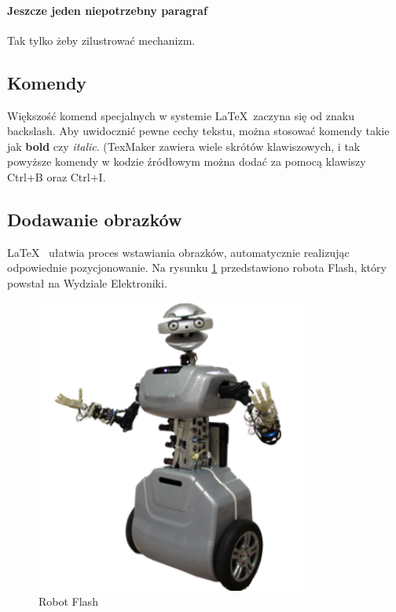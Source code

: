 \documentclass[12pt,a4paper]{article}
\begin{document}
\paragraph{Jeszcze jeden niepotrzebny paragraf} Tak tylko żeby zilustrować mechanizm.

\subsection{Komendy}
Większość komend specjalnych w systemie \LaTeX~zaczyna się od znaku backslash. Aby uwidocznić pewne cechy tekstu, można stosować komendy takie jak \textbf{bold} czy \textit{italic}.
(TexMaker zawiera wiele skrótów klawiszowych, i tak powyższe komendy w kodzie źródłowym można dodać za
pomocą klawiszy Ctrl+B oraz Ctrl+I.

\subsection{Dodawanie obrazków}

\LaTeX~ ułatwia proces wstawiania obrazków, automatycznie realizując odpowiednie pozycjonowanie. Na rysunku \ref{fig:flash} przedstawiono robota Flash, który powstał na Wydziale Elektroniki.
%
\begin{figure}[tp]
\centering
\includegraphics[width=0.8\textwidth]{figures/Flash.png}
\caption{Robot Flash \label{fig:flash}}
\end{figure}
\end{document}
